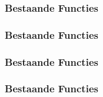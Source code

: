 \begin{frame}
  \frametitle{Bestaande Functies}
\end{frame}

\begin{frame}
  \frametitle{Bestaande Functies}
\end{frame}

\begin{frame}
  \frametitle{Bestaande Functies}
\end{frame}

\begin{frame}
  \frametitle{Bestaande Functies}
\end{frame}


